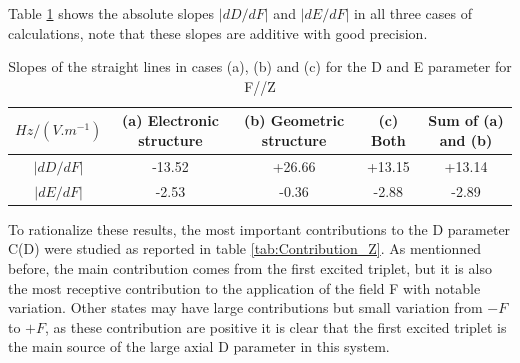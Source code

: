 \documentclass[10pt]{report}
\numberwithin{equation}{section}
\begin{document}
Table \ref{Slope_D_Z} shows the absolute slopes $|dD/dF|$ and $|dE/dF|$ in all three cases of calculations, note that these slopes are additive with good precision.

\begin{table}[!h]
    \begin{tabular}{c | c c c c}
        \hline
        $Hz/(V.m^{-1})$ &  (a) Electronic structure & (b) Geometric structure & (c) Both & Sum of (a) and (b)\\
        \hline
        $|dD/dF|$ & -13.52	& +26.66& 	+13.15 & 	+13.14\\
        $|dE/dF|$ &-2.53& 	-0.36& 	-2.88& 	-2.89\\
    \end{tabular}
    \caption{Slopes of the straight lines in cases (a), (b) and (c) for the D and E parameter for F//Z}
    \label{Slope_D_Z}
\end{table}

To rationalize these results, the most important contributions to the D parameter C(D) were studied as reported in table \ref{tab:Contribution_Z}.
As mentionned before, the main contribution comes from the first excited triplet, but it is also the most receptive contribution to the application of the field F with notable variation.
Other states may have large contributions but small variation from $-F$ to $+F$, as these contribution are positive it is clear that the first excited triplet is the main source of the large axial D parameter in this system.
\end{document}
